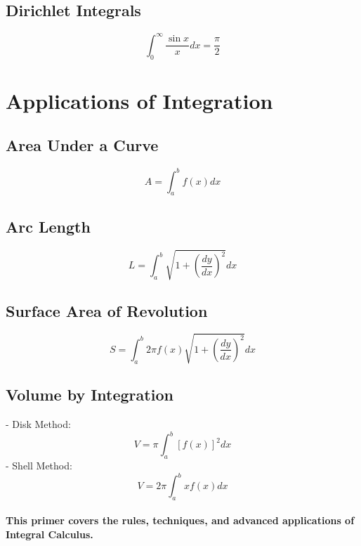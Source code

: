 \documentclass{article}
\begin{document}
\subsection{Dirichlet Integrals}
\[
\int_0^\infty \frac{\sin x}{x} dx = \frac{\pi}{2}
\]
\newpage
\section{Applications of Integration}
\subsection{Area Under a Curve}
\[
A = \int_a^b f(x) dx
\]
\subsection{Arc Length}
\[
L = \int_a^b \sqrt{1 + \left(\frac{dy}{dx}\right)^2} dx
\]
\subsection{Surface Area of Revolution}
\[
S = \int_a^b 2\pi f(x) \sqrt{1 + \left(\frac{dy}{dx}\right)^2} dx
\]
\subsection{Volume by Integration}
- Disk Method:
  \[
  V = \pi \int_a^b [f(x)]^2 dx
  \]
- Shell Method:
  \[
  V = 2\pi \int_a^b x f(x) dx
  \]
\newpage
\paragraph{This primer covers the rules, techniques, and advanced applications of Integral Calculus.}
\end{document}
